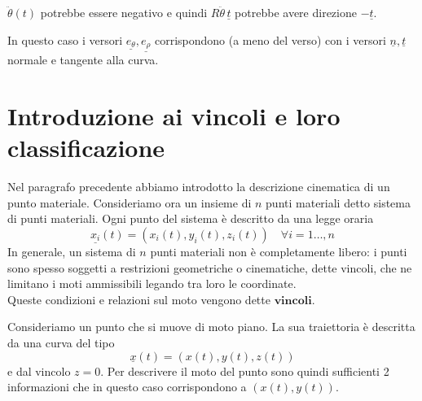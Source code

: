 \begin{center}
\end{center}
\begin{oss}{}
 $\ddot{\theta}(t)$ potrebbe essere negativo e quindi $R\ddot{\theta}\,\underline{t}$ potrebbe avere direzione $-\underline{t}$.
\end{oss}

\begin{oss}{}
    In questo caso i versori $\underline{e_\theta}, \underline{e_\rho}$ corrispondono (a meno del verso) con i versori $\underline{n} , \underline{t}$ normale e tangente alla curva.
\end{oss}

\section{Introduzione ai vincoli e loro classificazione}
Nel paragrafo precedente abbiamo introdotto la descrizione cinematica di un punto materiale. Consideriamo ora un insieme di $n$ punti materiali detto sistema di punti materiali. Ogni punto del sistema è descritto da una legge oraria
\[
\underline{x_i} (t) = (x_i(t) , y_i(t) , z_i(t)) \quad \forall i = 1 \ldots , n
\]
In generale, un sistema di $n$ punti  materiali non è completamente libero: i punti sono spesso soggetti a restrizioni geometriche o cinematiche, dette vincoli, che ne limitano i moti ammissibili legando tra loro le coordinate.\\
Queste condizioni e relazioni sul moto vengono dette $\textbf{vincoli}$.
\begin{example}{}
    Consideriamo un punto che si muove di moto piano. La sua traiettoria è descritta da una curva del tipo
    \[
    \underline{x}(t) = (x(t) , y(t) , z(t))
    \]
    e dal vincolo $z = 0$. Per descrivere il moto del punto sono quindi sufficienti 2 informazioni che in questo caso corrispondono a $(x(t) , y(t))$.
\end{example}

